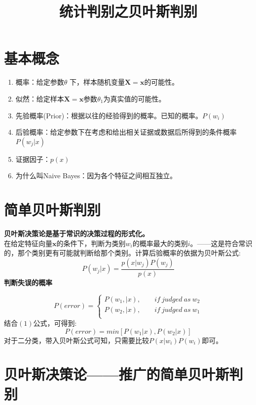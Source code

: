 \documentclass[12pt, letterpaper]{article}
\title{统计判别之贝叶斯判别}
\begin{document}
\maketitle
\tableofcontents
\newpage

\section{基本概念}
\begin{enumerate}
\item 概率：给定参数$\theta $ 下，样本随机变量$\mathbf{X}=\mathbf{x}$的可能性。
\item 似然：给定样本$\mathbf{X}=\mathbf{x}$参数$\theta_{1}$为真实值的可能性。
\item 先验概率(Prior)：根据以往的经验得到的概率。已知的概率。$P(w_i)$
\item 后验概率：给定参数下在考虑和给出相关证据或数据后所得到的条件概率$P(w_j|x)$
\item 证据因子：$p(x)$
\item 为什么叫Naive Bayes：因为各个特征之间相互独立。
\end{enumerate}
\section{简单贝叶斯判别}
\textbf{贝叶斯决策论是基于常识的决策过程的形式化。}\\
\indent 在给定特征向量$\mathbf{x}$的条件下，判断为类别$w_i$的概率最大的类别$i$。——这是符合常识的，那个类别更有可能就判断给那个类别。计算后验概率的依据为贝叶斯公式:
\begin{equation}
P(w_j|x)=\frac{p(x|w_j)P(w_j)}{p(x)}
\end{equation}
\indent \textbf{判断失误的概率}

$$ P(error)=\left\{
\begin{aligned}
P(w_1,|x), \qquad if\ judged\ as\ w_2 \\
P(w_2,|x), \qquad if\ judged\ as\ w_1 \\
\end{aligned}
\right.
$$
结合$(1)$公式，可得到:
\begin{equation}
P(error)=min[P(w_1|x), P(w_2|x)]
\end{equation}
对于二分类，带入贝叶斯公式可知，只需要比较$P(x|w_i)P(w_i)$即可。


\section{贝叶斯决策论——推广的简单贝叶斯判别}
\end{document}

